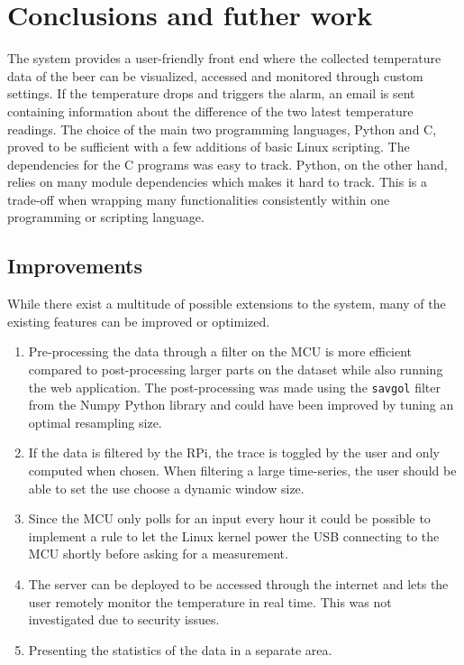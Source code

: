 \section{Conclusions and futher work}%
\label{sec:conclusions_and_futher_work}

The system provides a user-friendly front end where the collected temperature data of the beer can be visualized, accessed and monitored through custom settings. If the temperature drops and triggers the alarm, an email is sent containing information about the difference of the two latest temperature readings. The choice of the main two programming languages, Python and C, proved to be sufficient with a few additions of basic Linux scripting. The dependencies for the C programs was easy to track. Python, on the other hand, relies on many module dependencies which makes it hard to track. This is a trade-off when wrapping many functionalities consistently within one programming or scripting language.

\subsection{Improvements}%
\label{sub:improvements}
While there exist a multitude of possible extensions to the system, many of the existing features can be improved or optimized.

\begin{enumerate}
 \item Pre-processing the data through a filter on the MCU is more efficient compared to post-processing larger parts on the dataset while also running the web application. The post-processing was made using the \verb|savgol| filter from the Numpy Python library and could have been improved by tuning an optimal resampling size. 
 \item If the data is filtered by the RPi, the trace is toggled by the user and only computed when chosen. When filtering a large time-series, the user should be able to set the use choose a dynamic window size.
 \item Since the MCU only polls for an input every hour it could be possible to implement a rule to let the Linux kernel power the USB connecting to the MCU shortly before asking for a measurement.
 \item The server can be deployed to be accessed through the internet and lets the user remotely monitor the temperature in real time. This was not investigated due to security issues.
 \item Presenting the statistics of the data in a separate area.
\end{enumerate}
